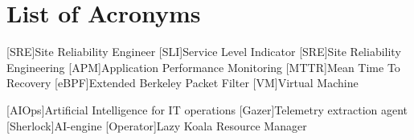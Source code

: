 \chapter*{List of Acronyms}

\begin{acronym}
[SRE]{Site Reliability Engineer}
[SLI]{Service Level Indicator}
[SRE]{Site Reliability Engineering}
[APM]{Application Performance Monitoring}
[MTTR]{Mean Time To Recovery}
[eBPF]{Extended Berkeley Packet Filter}
[VM]{Virtual Machine}

[AIOps]{Artificial Intelligence for IT operations}
[Gazer]{Telemetry extraction agent}
[Sherlock]{AI-engine}
[Operator]{Lazy Koala Resource Manager}
\end{acronym}